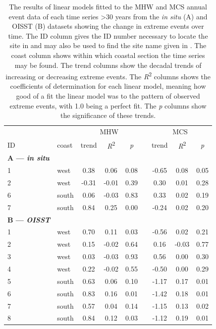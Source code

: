 \documentclass[a4paper,10pt,review]{elsarticle}
\begin{document}
\begin{table}[]
\centering
\caption{\small The results of linear models fitted to the MHW and MCS annual event data of each time series >30 years from the \emph{in situ} (A) and OISST (B) datasets showing the change in extreme events over time. The ID column gives the ID number necessary to locate the site in  and may also be used to find the site name given in . The coast column shows within which coastal section the time series may be found. The trend columns show the decadal trends of increasing or decreasing extreme events. The \emph{R}\textsuperscript{2} columns shows the coefficients of determination for each linear model, meaning how good of a fit the linear model was to the pattern of observed extreme events, with 1.0 being a perfect fit. The \emph{p} columns show the significance of these trends.}
\label{table4}
\begin{tiny}
\begin{tabular}{llccccccc}
\toprule
&& \multicolumn{3}{c}{MHW} & \phantom{abc} & \multicolumn{3}{c}{MCS} \\
\cmidrule{3-5} \cmidrule{7-9}
ID & coast & trend & \emph{R}\textsuperscript{2} & \emph{p} && trend & \emph{R}\textsuperscript{2} & \emph{p} \\
\midrule
{\bf{A} --- \emph{in situ}} \\
1 & west & 0.38 & 0.06 & 0.08 && -0.65 & 0.08 & 0.05 \\ 
  2 & west & -0.31 & -0.01 & 0.39 && 0.30 & 0.01 & 0.28 \\ 
  6 & south & 0.06 & -0.03 & 0.83 && 0.33 & 0.02 & 0.19 \\ 
  7 & south & 0.84 & 0.25 & 0.00 && -0.24 & 0.02 & 0.20 \\ 
{\bf{B} --- \emph{OISST}} \\
  1 & west & 0.70 & 0.11 & 0.03 && -0.56 & 0.02 & 0.21 \\ 
  2 & west & 0.15 & -0.02 & 0.64 && 0.16 & -0.03 & 0.77 \\ 
  3 & west & 0.03 & -0.03 & 0.93 && 0.56 & 0.00 & 0.30 \\ 
  4 & west & 0.22 & -0.02 & 0.55 && -0.50 & 0.00 & 0.29 \\ 
  5 & south & 0.63 & 0.06 & 0.10 && -1.17 & 0.17 & 0.01 \\ 
  6 & south & 0.83 & 0.16 & 0.01 && -1.42 & 0.18 & 0.01 \\ 
  7 & south & 0.57 & 0.04 & 0.14 && -1.15 & 0.13 & 0.02 \\ 
  8 & south & 0.84 & 0.12 & 0.03 && -1.12 & 0.19 & 0.01 \\ 

\end{tabular}
\end{tiny}
\end{table}
\end{document}
